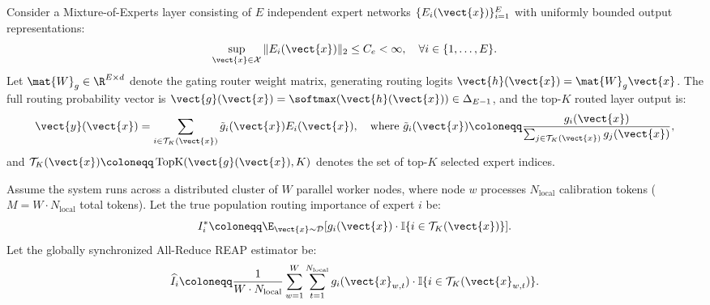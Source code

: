 \begin{theorem}
\label{thm:reap_unbiased}
Consider a Mixture-of-Experts layer consisting of $E$ independent expert networks $\{E_i(\vect{x})\}_{i=1}^E$ with uniformly bounded output representations:
\begin{equation}
\sup_{\vect{x} \in \mathcal{X}} \|E_i(\vect{x})\|_2 \le C_e < \infty, \quad \forall i \in \{1, \dots, E\}.
\end{equation}
Let $\mat{W}_g \in \R^{E \times d}$ denote the gating router weight matrix, generating routing logits $\vect{h}(\vect{x}) = \mat{W}_g \vect{x}$. The full routing probability vector is $\vect{g}(\vect{x}) = \softmax(\vect{h}(\vect{x})) \in \Delta_{E-1}$, and the top-$K$ routed layer output is:
\begin{equation}
\vect{y}(\vect{x}) = \sum_{i \in \mathcal{T}_K(\vect{x})} \tilde{g}_i(\vect{x}) E_i(\vect{x}), \quad \text{where } \tilde{g}_i(\vect{x}) \coloneqq \frac{g_i(\vect{x})}{\sum_{j \in \mathcal{T}_K(\vect{x})} g_j(\vect{x})},
\label{eq:moe_layer_output}
\end{equation}
and $\mathcal{T}_K(\vect{x}) \coloneqq \operatorname{TopK}(\vect{g}(\vect{x}), K)$ denotes the set of top-$K$ selected expert indices.

Assume the system runs across a distributed cluster of $W$ parallel worker nodes, where node $w$ processes $N_{\text{local}}$ calibration tokens ($M = W \cdot N_{\text{local}}$ total tokens). Let the true population routing importance of expert $i$ be:
\begin{equation}
I_i^* \coloneqq \E_{\vect{x} \sim \mathcal{D}} [ g_i(\vect{x}) \cdot \mathbb{I}\{i \in \mathcal{T}_K(\vect{x})\} ].
\label{eq:true_expert_importance}
\end{equation}
Let the globally synchronized All-Reduce REAP estimator be:
\begin{equation}
\widehat{I}_i \coloneqq \frac{1}{W \cdot N_{\text{local}}} \sum_{w=1}^W \sum_{t=1}^{N_{\text{local}}} g_i(\vect{x}_{w,t}) \cdot \mathbb{I}\{i \in \mathcal{T}_K(\vect{x}_{w,t})\}.
\label{eq:reap_distributed_estimator}
\end{equation}


\end{theorem}
